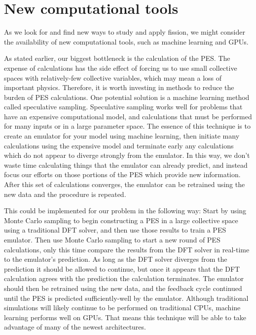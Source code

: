 

\section{New computational tools}
As we look for and find new ways to study and apply fission, we might consider the availability of new computational tools, such as machine learning and GPUs.

As stated earlier, our biggest bottleneck is the calculation of the PES. The expense of calculations has the side effect of forcing us to use small collective spaces with relatively-few collective variables, which may mean a loss of important physics. Therefore, it is worth investing in methods to reduce the burden of PES calculations. One potential solution is a machine learning method called speculative sampling. Speculative sampling works well for problems that have an expensive computational model, and calculations that must be performed for many inputs or in a large parameter space. The essence of this technique is to create an emulator for your model using machine learning, then initiate many calculations using the expensive model and terminate early any calculations which do not appear to diverge strongly from the emulator. In this way, we don't waste time calculating things that the emulator can already predict, and instead focus our efforts on those portions of the PES which provide new information. After this set of calculations converges, the emulator can be retrained using the new data and the procedure is repeated.

This could be implemented for our problem in the following way: Start by using Monte Carlo sampling to begin constructing a PES in a large collective space using a traditional DFT solver, and then use those results to train a PES emulator. Then use Monte Carlo sampling to start a new round of PES calculations, only this time compare the results from the DFT solver in real-time to the emulator's prediction. As long as the DFT solver diverges from the prediction it should be allowed to continue, but once it appears that the DFT calculation agrees with the prediction the calculation terminates. The emulator should then be retrained using the new data, and the feedback cycle continued until the PES is predicted sufficiently-well by the emulator. Although traditional simulations will likely continue to be performed on traditional CPUs, machine learning performs well on GPUs. That means this technique will be able to take advantage of many of the newest architectures.

